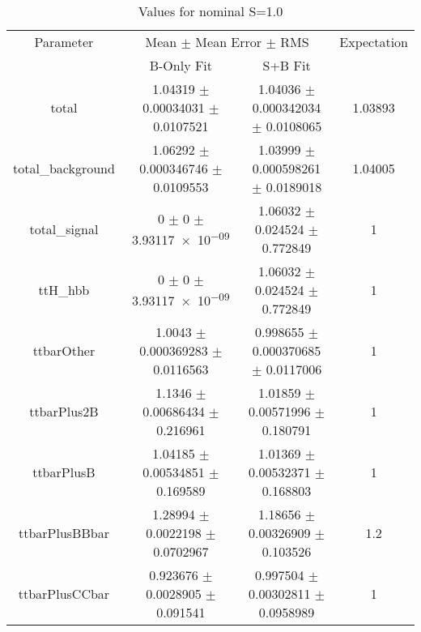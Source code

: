 \begin{table}
\centering
\caption{Values for nominal S=1.0}
\begin{tabular}{cccc}
\toprule
Parameter & \multicolumn{2}{c}{Mean $\pm$ Mean Error $\pm$ RMS} & Expectation\\
 & B-Only Fit & S+B Fit & \\
\midrule
total & \num{1.04319} $\pm$ \num{0.00034031} $\pm$ \num{0.0107521} & \num{1.04036} $\pm$ \num{0.000342034} $\pm$ \num{0.0108065} & \num{1.03893}\\
total\_background & \num{1.06292} $\pm$ \num{0.000346746} $\pm$ \num{0.0109553} & \num{1.03999} $\pm$ \num{0.000598261} $\pm$ \num{0.0189018} & \num{1.04005}\\
total\_signal & \num{0} $\pm$ \num{0} $\pm$ \num{3.93117e-09} & \num{1.06032} $\pm$ \num{0.024524} $\pm$ \num{0.772849} & \num{1}\\
ttH\_hbb & \num{0} $\pm$ \num{0} $\pm$ \num{3.93117e-09} & \num{1.06032} $\pm$ \num{0.024524} $\pm$ \num{0.772849} & \num{1}\\
ttbarOther & \num{1.0043} $\pm$ \num{0.000369283} $\pm$ \num{0.0116563} & \num{0.998655} $\pm$ \num{0.000370685} $\pm$ \num{0.0117006} & \num{1}\\
ttbarPlus2B & \num{1.1346} $\pm$ \num{0.00686434} $\pm$ \num{0.216961} & \num{1.01859} $\pm$ \num{0.00571996} $\pm$ \num{0.180791} & \num{1}\\
ttbarPlusB & \num{1.04185} $\pm$ \num{0.00534851} $\pm$ \num{0.169589} & \num{1.01369} $\pm$ \num{0.00532371} $\pm$ \num{0.168803} & \num{1}\\
ttbarPlusBBbar & \num{1.28994} $\pm$ \num{0.0022198} $\pm$ \num{0.0702967} & \num{1.18656} $\pm$ \num{0.00326909} $\pm$ \num{0.103526} & \num{1.2}\\
ttbarPlusCCbar & \num{0.923676} $\pm$ \num{0.0028905} $\pm$ \num{0.091541} & \num{0.997504} $\pm$ \num{0.00302811} $\pm$ \num{0.0958989} & \num{1}\\
\bottomrule
\end{tabular}
\end{table}